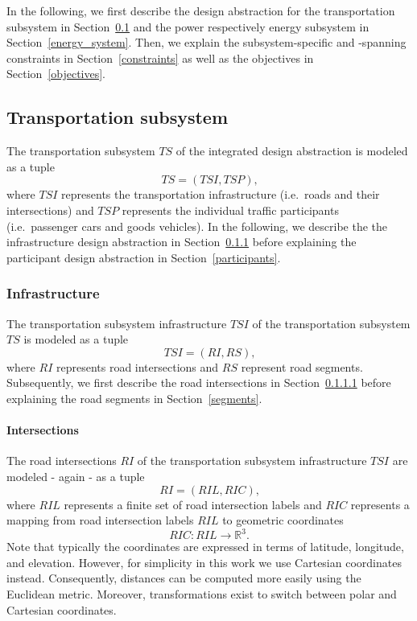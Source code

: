 In the following, we first describe the design abstraction for the transportation subsystem in Section~\ref{transport} and the power respectively energy subsystem in Section~\ref{energy_system}. Then, we explain the subsystem-specific and -spanning constraints in Section~\ref{constraints} as well as the objectives in Section~\ref{objectives}. 

\subsection{Transportation subsystem}
\label{transport}

The transportation subsystem $TS$ of the integrated design abstraction is modeled as a tuple
\[
	TS = (TSI, TSP) \textrm{,}
\]
where $TSI$ represents the transportation infrastructure (i.e.\ roads and their intersections) and $TSP$ represents the individual traffic participants (i.e.\ passenger cars and goods vehicles). In the following, we describe the the infrastructure design abstraction in Section~\ref{transport_infrastructure} before explaining the participant design abstraction in Section~\ref{participants}.

\subsubsection{Infrastructure}
\label{transport_infrastructure}

The transportation subsystem infrastructure $TSI$ of the transportation subsystem $TS$ is modeled as a tuple
\[
	TSI = (RI, RS) \textrm{,}
\]
where $RI$ represents road intersections and $RS$ represent road segments. Subsequently, we first describe the road intersections in Section~\ref{intersections} before explaining the road segments in Section~\ref{segments}.

\paragraph{Intersections}
\label{intersections}

The road intersections $RI$ of the transportation subsystem infrastructure $TSI$ are modeled - again - as a tuple
\[
	RI = (RIL, RIC) \textrm{,}
\]
where $RIL$ represents a finite set of road intersection labels and $RIC$ represents a mapping from road intersection labels $RIL$ to geometric coordinates
\[
	RIC: RIL \rightarrow \mathbb{R}^3 \mathrm{.}
\]
Note that typically the coordinates are expressed in terms of latitude, longitude, and elevation. However, for simplicity in this work we use Cartesian coordinates instead. Consequently, distances can be computed more easily using the Euclidean metric. Moreover, transformations exist to switch between polar and Cartesian coordinates.

